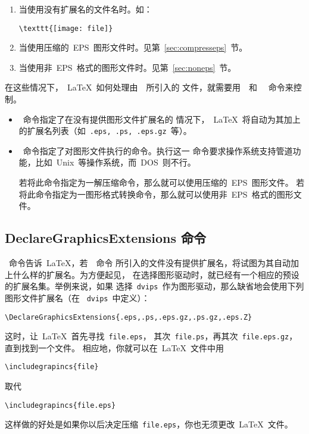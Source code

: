 \begin{enumerate}
	\item 当使用没有扩展名的文件名时。如：
	\begin{Verbatim}[xleftmargin=1cm]
	\texttt{[image: file]}
	\end{Verbatim}
	\item 当使用压缩的~EPS~图形文件时。见第~\ref{sec:compresseps}~节。
	\item 当使用非~EPS~格式的图形文件时。见第~\ref{sec:noneps}~节。
\end{enumerate}

在这些情况下，~\LaTeX{}~如何处理由~~所引入的
文件，就需要用~~和~~
命令来控制。

\begin{itemize}
	\item {}~命令指定了在没有提供图形文件扩展名的
	情况下，~\LaTeX{}~将自动为其加上的扩展名列表（如~\texttt{.eps, .ps,
		.eps.gz}~等）。
	\item {}~命令指定了对图形文件执行的命令。执行这一
	命令要求操作系统支持管道功能，比如~Unix~等操作系统，而~DOS~则不行。
	
	若将此命令指定为一解压缩命令，那么就可以使用压缩的~EPS~图形文件。
	若将此命令指定为一图形格式转换命令，那么就可以使用非~EPS~格式的图形文件。
\end{itemize}

\clearpage

\subsection{DeclareGraphicsExtensions 命令}\label{ssec:deextension}

~命令告诉~\LaTeX{}，若~~命令
所引入的文件没有提供扩展名，将试图为其自动加上什么样的扩展名。为方便起见，
在选择图形驱动时，就已经有一个相应的预设的扩展名集。举例来说，如果
选择~\texttt{dvips}~作为图形驱动，那么缺省地会使用下列图形文件扩展名（在
~\texttt{dvips}~中定义）：
\begin{Verbatim}[xleftmargin=1cm]
\DeclareGraphicsExtensions{.eps,.ps,.eps.gz,.ps.gz,.eps.Z}
\end{Verbatim}
这时，让~\LaTeX{}~首先寻找~\texttt{file.eps}，
其次~\texttt{file.ps}，再其次~\texttt{file.eps.gz}，直到找到一个文件。
相应地，你就可以在~\LaTeX{}~文件中用
\begin{Verbatim}[xleftmargin=1cm]
\includegrapincs{file}
\end{Verbatim}
取代
\begin{Verbatim}[xleftmargin=1cm]
\includegrapincs{file.eps}
\end{Verbatim}
这样做的好处是如果你以后决定压缩~\texttt{file.eps}，你也无须更改~\LaTeX{}~文件。

